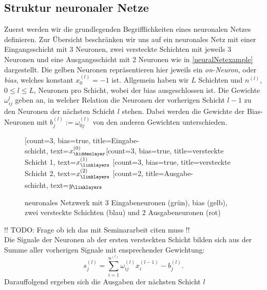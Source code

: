 \subsection{Struktur neuronaler Netze}
\label{subsec:struktur-eines-neuronalen-netzes}
Zuerst werden wir die grundlegenden Begrifflichkeiten eines neuronalen Netzes definieren. Zur Übersicht beschränken
wir uns auf ein neuronales Netz mit einer Eingangsschicht mit $3$ Neuronen, zwei versteckte Schichten mit jeweils
3 Neuronen und eine Ausgangsschicht mit 2 Neuronen wie in \eqref{neuralNetexample} dargestellt. Die gelben Neuronen
repräsentieren hier jeweils ein \textit{on-Neuron}, oder \textit{bias}, welches konstant $x_0^{(l)} = -1$ ist. Allgemein
haben wir $L$ Schichten und $n^{(l)}$, $0\leq l \leq L$, Neuronen pro Schicht, wobei der bias ausgeschlossen ist.
Die Gewichte $\omega_{ij}^{l}$ geben an, in welcher Relation die Neuronen der vorherigen Schicht $l-1$ zu den Neuronen der
nächsten Schicht $l$ stehen. Dabei werden die Gewichte der Bias-Neuronen mit $b_j^{(l)}:= \omega_{0j}^{(l)}$ von den
anderen Gewichten unterschieden.
\begin{figure}[htp]
    \centering
    \begin{neuralnetwork}[height=4]
        \newcommand{\x}[2]{$x^{(0)}_#2$}
        \newcommand{\y}[2]{$y_#2$}
        \newcommand{\hfirst}[2]{\small $x^{(1)}_#2$}
        \newcommand{\hsecond}[2]{\small $x^{(2)}_#2$}
        [count=3, bias=true, title=Eingabe-\\schicht, text=\x]
        \hiddenlayer[count=3, bias=true, title=versteckte\\Schicht 1, text=\hfirst]
        \linklayers
        \hiddenlayer[count=3, bias=true, title=versteckte\\Schicht 2, text=\hsecond]
        \linklayers
        \outputlayer[count=2, title=Ausgabe-\\schicht, text=\y] \linklayers
    \end{neuralnetwork}
    \caption{neuronales Netzwerk mit 3 Eingabeneuronen (grün), bias (gelb), zwei versteckte Schichten
        (blau) und 2 Ausgabeneuronen (rot)}
    \label{neuralNetexample}
\end{figure}
!! TODO: Frage ob ich das mit Seminararbeit citen muss !!\\
Die Signale der Neuronen ab der ersten versteckten Schicht bilden sich aus der Summe aller vorherigen
Signale mit ensprechender Gewichtung:
\[
    s_j^{(l)} = \sum_{i=1}^{n^{(l)}} \omega_{ij}^{(l)} x_i^{(l-1)} - b_j^{(l)}.
\]
Darauffolgend ergeben sich die Ausgaben der nächsten Schicht $l$
